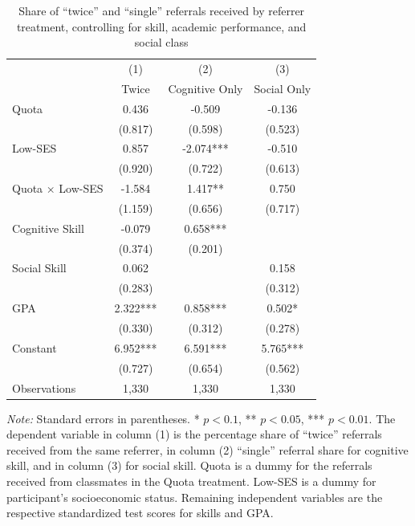 \documentclass[11pt,a4paper,oneside]{article}
\begin{document}
  \begin{table}[H]
    \centering
    \begin{threeparttable}
    \caption{Share of ``twice'' and ``single'' referrals received by referrer treatment, controlling for skill, academic performance, and social class}
    \label{tab:twice_treat}
    \begin{tabular*}{0.85\textwidth}{@{\extracolsep{\fill}}l c c c@{}}
    \toprule
    & (1) & (2) & (3) \\
    & Twice & Cognitive Only & Social Only \\
    \midrule
    Quota & 0.436 & -0.509 & -0.136 \\
    & (0.817) & (0.598) & (0.523) \\
    Low-SES & 0.857 & -2.074*** & -0.510 \\
    & (0.920) & (0.722) & (0.613) \\
    Quota × Low-SES & -1.584 & 1.417** & 0.750 \\
    & (1.159) & (0.656) & (0.717) \\
    Cognitive Skill & -0.079 & 0.658*** & \\
    & (0.374) & (0.201) & \\
    Social Skill & 0.062 & & 0.158 \\
    & (0.283) & & (0.312) \\
    GPA & 2.322*** & 0.858*** & 0.502* \\
    & (0.330) & (0.312) & (0.278) \\
    Constant & 6.952*** & 6.591*** & 5.765*** \\
    & (0.727) & (0.654) & (0.562) \\
    \midrule
    Observations & 1,330 & 1,330 & 1,330 \\
    \bottomrule
    \end{tabular*}
    \begin{tablenotes}[flushleft]
    \footnotesize
    \item[] \textit{Note:} Standard errors in parentheses. * $p < 0.1$, ** $p < 0.05$, *** $p < 0.01$. 
    The dependent variable in column (1) is the percentage share of ``twice'' referrals 
    received from the same referrer, in column (2) ``single'' referral share for cognitive 
    skill, and in column (3) for social skill. Quota is a dummy for the referrals received from classmates in the Quota treatment. Low-SES is a dummy for participant's socioeconomic status.  Remaining independent variables are the respective standardized test scores for skills and GPA.
    \end{tablenotes}
    \end{threeparttable}
    \end{table}
\end{document}
